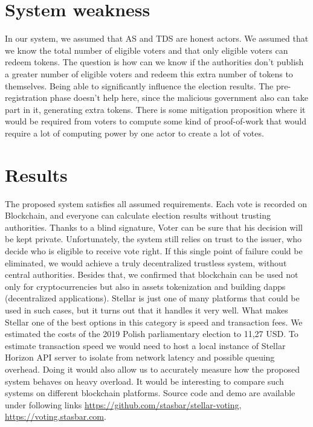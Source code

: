 \documentclass[runningheads]{llncs}
\begin{document}
\section{System weakness}
In our system, we assumed that AS and TDS are honest actors. We assumed that we know the total number of eligible voters and that only eligible voters can redeem tokens. The question is how can we know if the authorities don't publish a greater number of eligible voters and redeem this extra number of tokens to themselves. Being able to significantly influence the election results. The pre-registration phase doesn't help here, since the malicious government also can take part in it, generating extra tokens. There is some mitigation proposition where it would be required from voters to compute some kind of proof-of-work that would require a lot of computing power by one actor to create a lot of votes.

\section{Results}
The proposed system satisfies all assumed requirements. Each vote is recorded on Blockchain, and everyone can calculate election results without trusting authorities. Thanks to a blind signature, Voter can be sure that his decision will be kept private. Unfortunately, the system still relies on trust to the issuer, who decide who is eligible to receive vote right. If this single point of failure could be eliminated, we would achieve a truly decentralized trustless system, without central authorities.
Besides that, we confirmed that blockchain can be used not only for cryptocurrencies but also in assets tokenization and building dapps (decentralized applications). Stellar is just one of many platforms that could be used in such cases, but it turns out that it handles it very well. What makes Stellar one of the best options in this category is speed and transaction fees. We estimated the costs of the 2019 Polish parliamentary election to 11,27 USD. To estimate transaction speed we would need to host a local instance of Stellar Horizon API server to isolate from network latency and possible queuing overhead. Doing it would also allow us to accurately measure how the proposed system behaves on heavy overload. It would be interesting to compare such systems on different blockchain platforms. Source code and demo are available under following links \url{https://github.com/stasbar/stellar-voting}, \url{https://voting.stasbar.com}.

  



\end{document}
